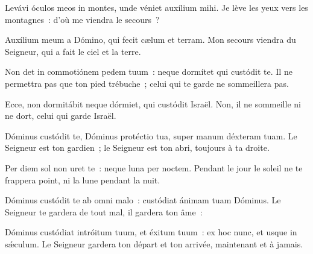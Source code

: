 \begin{paracol}{2}

\LigneParacol{0cm}
{Levávi óculos meos in montes, \GreStar{} unde véniet auxílium mihi.}
{Je lève les yeux vers les montagnes~: d'où me viendra le secours~?}

\LigneParacol{0.2cm}
{Auxílium meum a Dómino, \GreStar{} qui fecit cælum et terram.}
{Mon secours viendra du Seigneur, qui a fait le ciel et la terre.}

\LigneParacol{0.2cm}
{Non det in commotiónem pedem tuum~: \GreStar{} neque dormítet qui custódit te.}
{Il ne permettra pas que ton pied trébuche~; celui qui te garde ne sommeillera pas.}

\LigneParacol{0.2cm}
{Ecce, non dormitábit neque dórmiet, \GreStar{} qui custódit Israël.}
{Non, il ne sommeille ni ne dort, celui qui garde Israël.}

\LigneParacol{0.2cm}
{Dóminus custódit te, Dóminus protéctio tua, \GreStar{} super manum déxteram tuam.}
{Le Seigneur est ton gardien~; le Seigneur est ton abri, toujours à ta droite.}

\LigneParacol{0.2cm}
{Per diem sol non uret te~: \GreStar{} neque luna per noctem.}
{Pendant le jour le soleil ne te frappera point, ni la lune pendant la nuit.}

\LigneParacol{0.2cm}
{Dóminus custódit te ab omni malo~: \GreStar{} custódiat ánimam tuam Dóminus.}
{Le Seigneur te gardera de tout mal, il gardera ton âme~:}

\LigneParacol{0.2cm}
{Dóminus custódiat intróitum tuum, et éxitum tuum~: \GreStar{} ex hoc nunc, et usque in sǽculum.}
{Le Seigneur gardera ton départ et ton arrivée, maintenant et à jamais.}

\end{paracol}
\Gloria
{}
